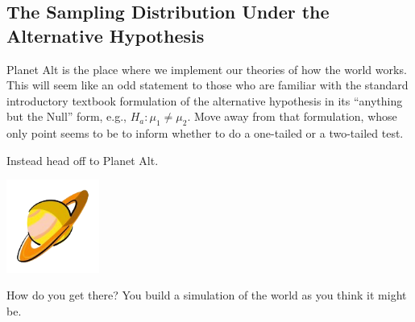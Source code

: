 \subsection{The Sampling Distribution Under the Alternative Hypothesis}

Planet Alt is the place where we implement our theories of how the
world works.  This will seem like an odd statement to those who are
familiar with the standard introductory textbook formulation of the
alternative hypothesis in its ``anything  but the Null'' form, e.g.,
$H_a : \mu_1 \neq \mu_2$.  Move away from that formulation, whose only
point seems to be to inform whether to do a one-tailed or a two-tailed test.

Instead head off to Planet Alt.

\centerline{\includegraphics[width=1.2in]{images/planet-alt.png}}

How do you get there?  You build a simulation of the world as you
think it might be.  

